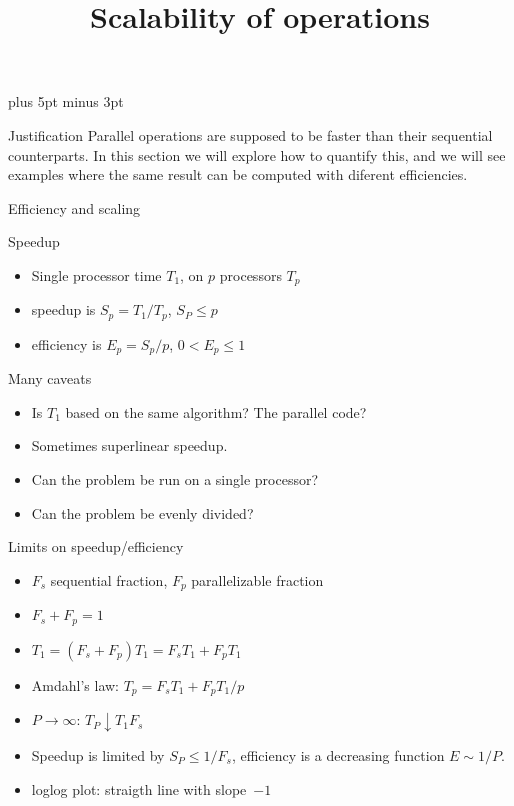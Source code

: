 \documentclass[11pt]{beamer}
\begin{document}
\parskip=10pt plus 5pt minus 3pt


\title{Scalability of operations}
\author{\hpcteachers}
\date{\hpcsemester}

\begin{frame}
  \titlepage
\end{frame}

\begin{frame}{Justification}
  Parallel operations are supposed to be faster than their sequential
  counterparts. In this section we will explore how to quantify this,
  and we will see examples where the same result can be computed with
  diferent efficiencies.
\end{frame}



 {Efficiency and scaling}

\begin{frame}{Speedup}
  \begin{itemize}
  \item Single processor time $T_1$, on $p$ processors $T_p$
  \item speedup is $S_p=T_1/T_p$, $S_P\leq p$
  \item efficiency is $E_p=S_p/p$, $0< E_p\leq 1$
  \end{itemize}
Many caveats
\begin{itemize}
\item Is $T_1$ based on the same algorithm? The parallel code?
\item Sometimes superlinear speedup.
\item Can the problem be run on a single processor?
\item Can the problem be evenly divided?
\end{itemize}
\end{frame}

\begin{frame}{Limits on speedup/efficiency}
  \begin{itemize}
  \item $F_s$ sequential fraction, $F_p$ parallelizable fraction
  \item $F_s+F_p=1$
  \item $T_1 = (F_s+F_p)T_1 = F_sT_1 + F_pT_1 $
  \item Amdahl's law: $T_p = F_sT_1 + F_pT_1/p $
  \item $P\rightarrow\infty$: $T_P\downarrow T_1F_s$
  \item Speedup is limited by $S_P\leq 1/F_s$,
    efficiency is a decreasing function $E\sim 1/P$.
  \item loglog plot: straigth line with slope~$-1$
  \end{itemize}  
\end{frame}
\end{document}
